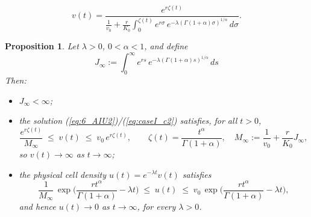 \documentclass[10pt,a4paper]{amsart}
\newtheorem{proposition}{Proposition}
\begin{document}
\begin{equation}\label{eq:caseI_c2}
v(t)=\frac{e^{r\zeta(t)}}{\displaystyle \frac{1}{v_0}+\frac{r}{K_0}\int_0^{\zeta(t)}e^{r\sigma}\,e^{-\lambda(\Gamma(1+\alpha)\sigma)^{1/\alpha}}\,d\sigma}.
\end{equation}

\begin{proposition}\label{proposition:3}
Let $\lambda>0$, $0<\alpha<1$, and define
\begin{equation*}
J_\infty:=\int_0^\infty e^{rs}\,e^{-\lambda(\Gamma(1+\alpha)s)^{1/\alpha}}\,ds
\end{equation*}
Then:
\begin{itemize}
\item[(i)] $J_\infty<\infty$;


\item[(ii)] the solution (\ref{eq:6_AIU2})/(\ref{eq:caseI_c2}) satisfies, for all $t>0$,
$$\frac{e^{r\zeta(t)}}{M_\infty} \;\le\; v(t) \;\le\; v_0\,e^{r\zeta(t)}, \qquad \zeta(t)=\frac{t^\alpha}{\Gamma(1+\alpha)},\quad M_\infty:=\frac{1}{v_0}+\frac{r}{K_0}J_\infty,$$
so $v(t)\to\infty$ as $t\to\infty$;
\item[(iii)] the physical cell density $u(t)=e^{-\lambda t}v(t)$ satisfies
$$\frac{1}{M_\infty}\,\exp\!\Big(\frac{rt^\alpha}{\Gamma(1+\alpha)}-\lambda t\Big) \;\le\; u(t) \;\le\; v_0\,\exp\!\Big(\frac{rt^\alpha}{\Gamma(1+\alpha)}-\lambda t\Big),$$
and hence $u(t)\to 0$ as $t\to\infty$, for every $\lambda>0$.
\end{itemize}
\end{proposition}
\end{document}
